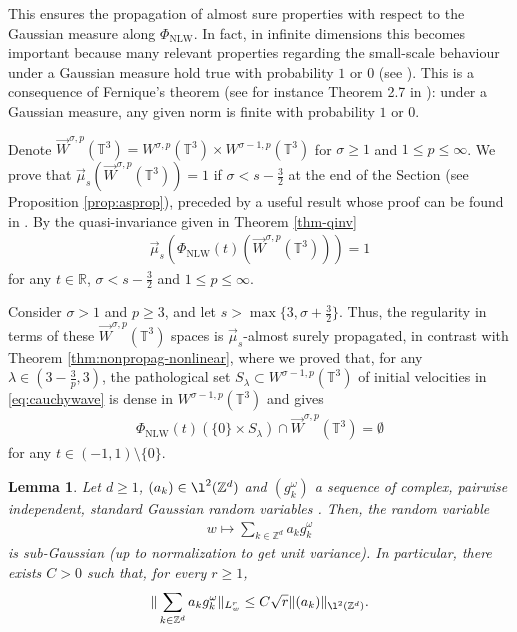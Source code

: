 \documentclass[a4paper, reqno, 11pt]{amsart}
\newtheorem{lemma}[theorem]{Lemma}
\theoremstyle{definition}
\begin{document}
This ensures the propagation of almost sure properties with respect to the Gaussian measure along $\Phi_{\text{NLW}}$. In fact, in infinite dimensions this becomes important because many relevant properties regarding the small-scale behaviour under a Gaussian measure hold true with probability $1$ or $0$ (see \cite{Bogachev1998}). This is a consequence of Fernique's theorem (see for instance Theorem 2.7 in \cite{PZ14}): under a Gaussian measure, any given norm is finite with probability $1$ or $0$. 

Denote $\vec{W}^{\sigma,p}(\mathbb{T}^3) = W^{\sigma,p}(\mathbb{T}^3) \times W^{\sigma-1,p}(\mathbb{T}^3)$ for $\sigma \geq 1$ and $1 \leq p \leq \infty$. We prove that $\vec{\mu}_s(\vec{W}^{\sigma,p}(\mathbb{T}^3)) = 1$ if $\sigma < s - \frac{3}{2}$ at the end of the Section (see Proposition \ref{prop:asprop}), preceded by a useful result whose proof can be found in \cite{BurqTzvet}. By the quasi-invariance given in Theorem \ref{thm-qinv}
\begin{align*}
\vec{\mu}_s(\Phi_{\text{NLW}}(t)(\vec{W}^{\sigma,p}(\mathbb{T}^3))) = 1
\end{align*}
for any $t \in \mathbb{R}$, $\sigma < s - \frac{3}{2}$ and $1 \leq p \leq \infty$. 

Consider $\sigma > 1$ and $p\geq 3$, and let $s > \max\{3,\sigma + \frac{3}{2}\}$. Thus, the regularity in terms of these $\vec{W}^{\sigma,p}(\mathbb{T}^3)$ spaces is $\vec{\mu}_s$-almost surely propagated, in contrast with Theorem \ref{thm:nonpropag-nonlinear}, where we proved that, for any $\lambda \in (3 - \frac{3}{p},3)$, the pathological set $S_{\lambda} \subset W^{\sigma-1,p}(\mathbb{T}^3)$ of initial velocities in \eqref{eq:cauchywave} is dense in $W^{\sigma-1,p}(\mathbb{T}^3)$ and gives 
\begin{align*}
\Phi_{\text{NLW}}(t)(\{0\} \times S_{\lambda}) \cap \vec{W}^{\sigma,p}(\mathbb{T}^3) = \emptyset
\end{align*}
for any $t \in (-1,1) \setminus \{0\}$.
\begin{lemma}\label{lemma:1deg-wchaos}
		Let $d \geq 1$, $(a_k) \in \l^2(\mathbb{Z}^d)$ and $(g^{\omega}_k)$ a sequence of complex, pairwise independent, standard Gaussian random variables . Then, the random variable
		\begin{align*}
			w \mapsto \sum_{k \in \mathbb{Z}^d} a_k g^{\omega}_k
		\end{align*}
		is sub-Gaussian (up to normalization to get unit variance). In particular, there exists $C>0$ such that, for every $r \geq 1$,
		\begin{align}
			\| \sum_{k \in \mathbb{Z}^d} a_k g^{\omega}_k\|_{L^r_w} \leq C \sqrt{r} \|(a_k)\|_{\l^2(\mathbb{Z}^d)}.
		\end{align}
		\label{lemma:randomsum-key}
	\end{lemma}
\end{document}
